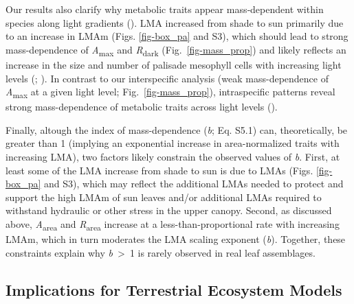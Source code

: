 \documentclass[
  12pt,
  letterpaper,
  DIV=11,
  numbers=noendperiod]{scrartcl}
\begin{document}
Our results also clarify why metabolic traits appear mass‐dependent
within species along light gradients (). LMA increased from shade to sun primarily due to an increase
in LMAm (Figs. \ref{fig-box_pa} and S3), which should lead to strong
mass-dependence of \emph{A}\textsubscript{max} and
\emph{R}\textsubscript{dark} (Fig.~\ref{fig-mass_prop}) and likely
reflects an increase in the size and number of palisade mesophyll cells
with increasing light levels (; ). In contrast
to our interspecific analysis (weak mass-dependence of
\emph{A}\textsubscript{max} at a given light level;
Fig.~\ref{fig-mass_prop}), intraspecific patterns reveal strong
mass-dependence of metabolic traits across light levels
().

Finally, altough the index of mass-dependence (\emph{b}; Eq. S5.1) can,
theoretically, be greater than 1 (implying an exponential increase in
area-normalized traits with increasing LMA), two factors likely
constrain the observed values of \emph{b}. First, at least some of the
LMA increase from shade to sun is due to LMAs (Figs. \ref{fig-box_pa}
and S3), which may reflect the additional LMAs needed to protect and
support the high LMAm of sun leaves and/or additional LMAs required to
withstand hydraulic or other stress in the upper canopy. Second, as
discussed above, \emph{A}\textsubscript{area} and
\emph{R}\textsubscript{area} increase at a less-than-proportional rate
with increasing LMAm, which in turn moderates the LMA scaling exponent
(\emph{b}). Together, these constraints explain why
\emph{b}~\textgreater~1 is rarely observed in real leaf assemblages.

\subsection{Implications for Terrestrial Ecosystem
Models}\label{implications-for-terrestrial-ecosystem-models}
\end{document}
